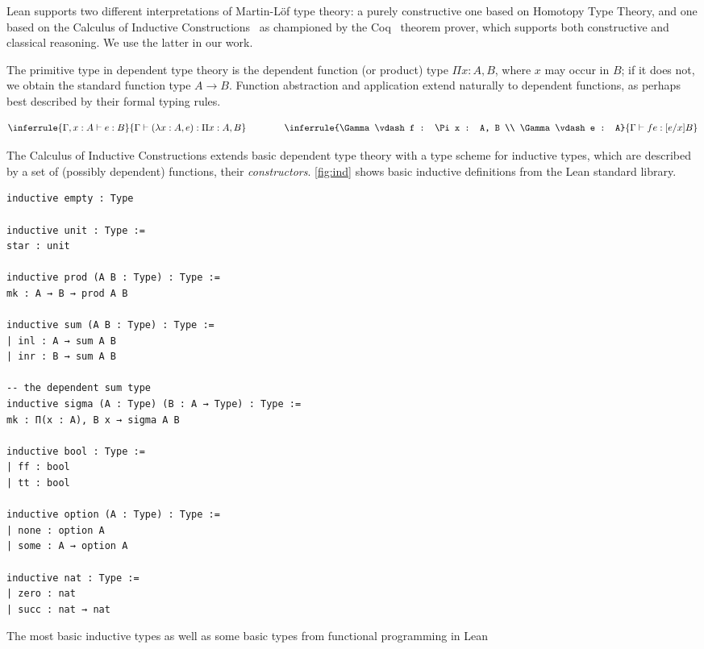 Lean supports two different interpretations of Martin-Löf type theory:
a purely constructive one based on Homotopy Type Theory, and one based on the
Calculus of Inductive
Constructions~\cite{coquand1988calculus,pfenning1989inductively} as championed
by the Coq~\cite{barras1997coq} theorem prover, which supports both constructive
and classical reasoning. We use the latter in our work.

The primitive type in dependent type theory is the dependent function (or
product) type $\Pi x : A, B$, where $x$ may occur in $B$; if it does not, we
obtain the standard function type $A \rightarrow B$. Function abstraction and
application extend naturally to dependent functions, as perhaps best described
by their formal typing rules.

\[
  \inferrule
    {\Gamma, x : A \vdash e : B}
    {\Gamma \vdash (\lambda x : A, e) : \Pi x : A, B}
  \hspace{4em}
  \inferrule
    {\Gamma \vdash f : \Pi x : A, B \\ \Gamma \vdash e : A}
    {\Gamma \vdash f e : [e/x]B}
\]

The Calculus of Inductive Constructions extends basic dependent type theory with
a type scheme for inductive types, which are described by a set of (possibly
dependent) functions, their \emph{constructors}. \autoref{fig:ind} shows basic
inductive definitions from the Lean standard library.

\begin{listing}[btp]
  \begin{verbatim}
inductive empty : Type

inductive unit : Type :=
star : unit

inductive prod (A B : Type) : Type :=
mk : A → B → prod A B

inductive sum (A B : Type) : Type :=
| inl : A → sum A B
| inr : B → sum A B

-- the dependent sum type
inductive sigma (A : Type) (B : A → Type) : Type :=
mk : Π(x : A), B x → sigma A B

inductive bool : Type :=
| ff : bool
| tt : bool

inductive option (A : Type) : Type :=
| none : option A
| some : A → option A

inductive nat : Type :=
| zero : nat
| succ : nat → nat
  \end{verbatim}

  \caption{The most basic inductive types as well as some basic types from
    functional programming in Lean}
  \label{lst:ind}
\end{listing}

